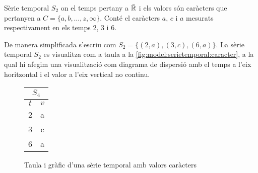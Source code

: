 \begin{example}
  Sèrie temporal $S_2$ on el temps pertany a $\bar{\mathbb{R}{}}$ i els valors
  són caràcters que pertanyen a $C=\{a,b,\dotsc,z,\infty\}$. Conté el
  caràcters $a$, $c$ i $a$ mesurats respectivament en els temps $2$,
  $3$ i $6$.

De manera simplificada s'escriu com $S_2 = \{ (2,a), (3,c), (6,a) \}$.
La sèrie temporal $S_2$ es visualitza com a taula a la
\autoref{fig:model:serietemporal:caracter}, a la qual hi afegim una
visualització com diagrama de dispersió amb el temps a l'eix
horitzontal i el valor a l'eix vertical no continu.

\begin{figure}[tp]
  \centering
  \begin{tabular}[c]{|c|c|}
    \multicolumn{2}{c}{$S_4$} \\ \hline
    $t$  & $v$ \\ \hline
    2  & a \\
    3  & c \\
    6  & a \\ \hline
  \end{tabular} \qquad
  \caption{Taula i gràfic d'una sèrie temporal amb valors caràcters}
  \label{fig:model:serietemporal:caracter}
\end{figure}

\end{example}



